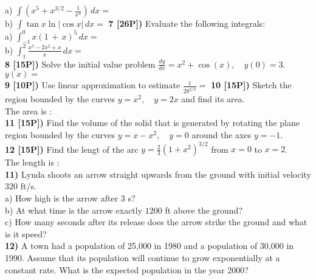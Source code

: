 \documentclass[12pt]{article}
\begin{document}
a) 
$\displaystyle{\int \left( x^5 + x^{3/2} - \frac{1}{x^4}
\right)\, dx =}$
\\ %
b) $\displaystyle{\int \tan x \ln |\cos x| \, dx=}$
{\bf 7 [26P])} Evaluate the following integrals:
\\ %
a)  $\displaystyle{\int_{-1}^0 x(1\, + \, x)^5\, dx = }$
\\ %
b)  $\displaystyle{\int_1^2\frac{ x^3 - 2x^2 + x}{x}\, 
dx=}$
\\ %
{\bf 8 [15P])} Solve the initial value problem
$\displaystyle{ \frac{dy}{dx} = x^2 + \cos (x),\quad y(0) = 3}$.
\\ %
$\displaystyle{y(x) = }$
\\ %
{\bf 9 [10P])}
Use linear approximation to estimate
$\displaystyle{\frac{1}{28^{2/3}}= }$
{\bf 10 [15P])} Sketch the region bounded by the curves
$\displaystyle{y=x^2,\quad y=  2x}$ and find its area.
\\ %
The area is :
\\ %
{\bf 11 [15P])} Find the volume of the solid that is generated
by rotating the plane region bounded
by the curves  $\displaystyle{y= x -x ^2,\quad
y = 0}$ around the axes  $y=-1$.
\\ %
{\bf 12 [15P])} Find the lengt of the arc
$\displaystyle{y = \frac{2}{3}\left(1 + x^2\right)^{3/2}}$
from $\displaystyle{x=0}$ to $\displaystyle{x = 2}$.
\\ %
The length is : 
\\ %
{\bf 11)} Lynda shoots an arrow straight upwards from the
ground with initial velocity $320$ ft/s.
\\ %
a) How high is the arrow after $3$ s?
\\
b) At what time is the arrow exactly $1200$ ft above
the ground?
\\
c) How many seconds after its release does the arrow strike the
ground and what is it speed?
\\ %
{\bf 12)} A town had a population of 25,000 in 1980 and
a population of 30,000 in 1990. Assume that its population
will continue to grow exponentially at a constant
rate. What is the expected population in the year 2000?
\\ %
\end{document}
